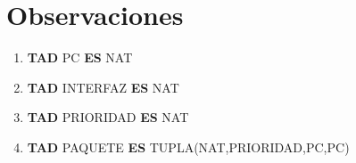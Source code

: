 \documentclass[a4paper,spanish, 10pt]{article}
\begin{document}
\pagestyle{fancy}
\thispagestyle{fancy}
\addtolength{\headheight}{1pt}
\cfoot{\thepage /\pageref{LastPage}}
\renewcommand{\footrulewidth}{0.4pt}

\author{Algoritmos y Estructuras de Datos II, DC, UBA.}
\date{}
\title{}


%

 \section{Observaciones}

 	\begin{enumerate}
 	    \item \textbf{TAD} PC \textbf{ES} NAT
	    \item \textbf{TAD} INTERFAZ \textbf{ES} NAT
	    \item \textbf{TAD} PRIORIDAD \textbf{ES} NAT
	    \item \textbf{TAD} PAQUETE \textbf{ES} TUPLA(NAT,PRIORIDAD,PC,PC)
	\end{enumerate}
%

%
%
\end{document}
